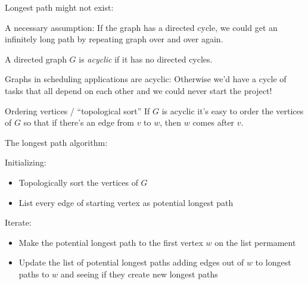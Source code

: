 \documentclass{beamer}
\begin{document}
\begin{frame}{Longest path might not exist:}

  \begin{block}{A necessary assumption:}
    If the graph has a directed cycle, we could get an infinitely long path by repeating graph over and over again.  
  \end{block}

  \begin{definition}A directed graph $G$ is \emph{acyclic} if it has no directed cycles.
  \end{definition}

  \begin{block}{Graphs in scheduling applications are acyclic:}
 Otherwise we'd have a cycle of tasks that all depend on each other and we could never start the project!  
\end{block}

  \begin{block}{Ordering vertices / ``topological sort''}
    If $G$ is acyclic it's easy to order the vertices of $G$ so that if there's an edge from $v$ to $w$, then $w$ comes after $v$.
\end{block}
\end{frame}

\begin{frame}{The longest path algorithm:}
\begin{block}{Initializing:}
  \begin{itemize}
    \item Topologically sort the vertices of $G$ 
    \item List every edge of starting vertex as potential longest path
  \end{itemize}
\end{block}

\begin{block}{Iterate:}
  \begin{itemize}
  \item Make the potential longest path to the first vertex $w$  on the list permament
  \item Update the list of potential longest paths adding edges out of $w$ to longest paths to $w$ and seeing if they create new longest paths
  \end{itemize}
  \end{block}
  
  

  
  \end{frame}
\end{document}
